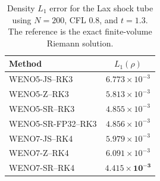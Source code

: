 \begin{table}[H]
\centering
\caption{Density $L_1$ error for the Lax shock tube using $N=200$, CFL
$0.8$, and $t=1.3$.  The reference is the exact finite-volume Riemann
solution.}
\label{tab:lax_l1_weno_z}
\small
\begin{tabular}{lc}
\toprule
Method & $L_1(\rho)$ \\
\midrule
WENO5-JS--RK3      & $6.773\times10^{-3}$ \\
WENO5-Z--RK3       & $5.813\times10^{-3}$ \\
WENO5-SR--RK3      & $4.855\times10^{-3}$ \\
WENO5-SR-FP32--RK3 & $4.856\times10^{-3}$ \\
WENO7-JS--RK4      & $5.979\times10^{-3}$ \\
WENO7-Z--RK4       & $6.091\times10^{-3}$ \\
WENO7-SR--RK4      & $\mathbf{4.415\times10^{-3}}$ \\
\bottomrule
\end{tabular}
\end{table}

